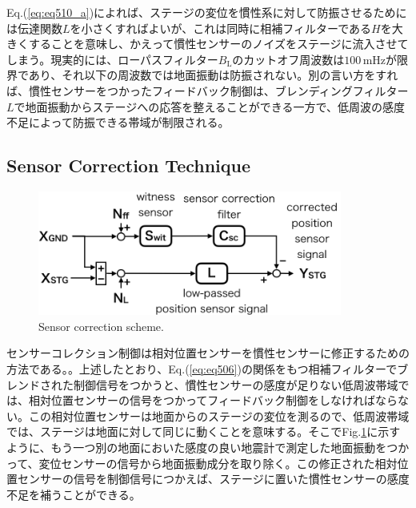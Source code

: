 Eq.(\ref{eq:eq510_a})によれば、ステージの変位を慣性系に対して防振させるためには伝達関数$L$を小さくすればよいが、これは同時に相補フィルターである$H$を大きくすることを意味し、かえって慣性センサーのノイズをステージに流入させてしまう。現実的には、ローパスフィルター$B_{\mathrm{L}}$のカットオフ周波数は$100\,\mathrm{mHz}$が限界であり、それ以下の周波数では地面振動は防振されない。別の言い方をすれば、慣性センサーをつかったフィードバック制御は、ブレンディングフィルター$L$で地面振動からステージへの応答を整えることができる一方で、低周波の感度不足によって防振できる帯域が制限される。



\subsection{Sensor Correction Technique}
\begin{figure}[h]
  \begin{center}   
    \includegraphics[width=10cm]{./img_chap5/img505.png}
    \caption{Sensor correction scheme.} \label{img:img505}
  \end{center}
\end{figure}
センサーコレクション制御は相対位置センサーを慣性センサーに修正するための方法である。\cite{hua2005low}。上述したとおり、Eq.(\ref{eq:eq506})の関係をもつ相補フィルターでブレンドされた制御信号をつかうと、慣性センサーの感度が足りない低周波帯域では、相対位置センサーの信号をつかってフィードバック制御をしなければならない。この相対位置センサーは地面からのステージの変位を測るので、低周波帯域では、ステージは地面に対して同じに動くことを意味する。そこでFig.\ref{img:img505}に示すように、もう一つ別の地面においた感度の良い地震計で測定した地面振動をつかって、変位センサーの信号から地面振動成分を取り除く。この修正された相対位置センサーの信号を制御信号につかえば、ステージに置いた慣性センサーの感度不足を補うことができる。

